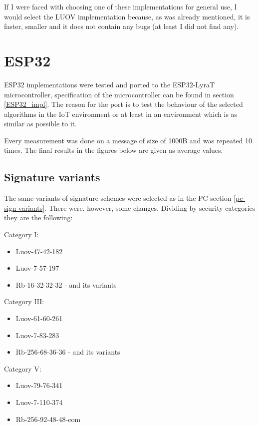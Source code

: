 \documentclass[thesis=M,english]{FITthesis}[2019/12/23]
\begin{document}
\bigskip
\noindent
If I were faced with choosing one of these implementations for general use, I would select the LUOV implementation because, as was already mentioned, it is faster, smaller and it does not contain any bugs (at least I did not find any). 

\newpage
\section{ESP32}
ESP32 implementations were tested and ported to the ESP32-LyraT microcontroller, specification of the microcontroller can be found in section \ref{ESP32_impl}. The reason for the port is to test the behaviour of the selected algorithms in the IoT environment or at least in an environment which is as similar as possible to it.

\bigskip
\noindent
Every measurement was done on a message of size of 1000B and was repeated 10 times. The final results in the figures below are given as average values.

\subsection{Signature variants}
The same variants of signature schemes were selected as in the PC section \ref{pc-sign-variants}. There were, however, some changes. Dividing by security categories they are the following: 

\bigskip
\noindent
Category I:
\begin{itemize}
\item Luov-47-42-182
\item Luov-7-57-197
\item Rb-16-32-32-32 - and its variants
\end{itemize}

\noindent
Category III:
\begin{itemize}
\item Luov-61-60-261
\item Luov-7-83-283
\item Rb-256-68-36-36 - and its variants
\end{itemize}

\noindent
Category V:
\begin{itemize}
\item Luov-79-76-341
\item Luov-7-110-374
\item Rb-256-92-48-48-com
\end{itemize}
\end{document}
